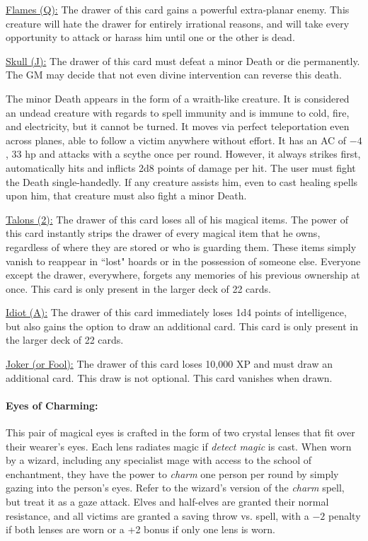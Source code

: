\begin{multicols}{2}
\underline{Flames (Q):} The drawer of this card gains a powerful extra-planar enemy.  This creature will hate the drawer for entirely irrational reasons, and will take every opportunity to attack or harass him until one or the other is dead. 

\underline{Skull (J):} The drawer of this card must defeat a minor Death or die permanently.  The GM may decide that not even divine intervention can reverse this death.  

The minor Death appears in the form of a wraith-like creature.  It is considered an undead creature with regards to spell immunity and is immune to cold, fire, and electricity, but it cannot be turned.  It moves via perfect teleportation even across planes, able to follow a victim anywhere without effort.  It has an AC of $-4$, 33 hp and attacks with a scythe once per round.  However, it always strikes first, automatically hits and inflicts 2d8 points of damage per hit.  The user must fight the Death single-handedly.  If any creature assists him, even to cast healing spells upon him, that creature must also fight a minor Death.  

\underline{Talons (2):} The drawer of this card loses all of his magical items.  The power of this card instantly strips the drawer of every magical item that he owns, regardless of where they are stored or who is guarding them.  These items simply vanish to reappear in ``lost" hoards or in the possession of someone else.  Everyone except the drawer, everywhere, forgets any memories of his previous ownership at once.  This card is only present in the larger deck of 22 cards.

\underline{Idiot (A):} The drawer of this card immediately loses 1d4 points of intelligence, but also gains the option to draw an additional card.  This card is only present in the larger deck of 22 cards.

\underline{Joker (or Fool):} The drawer of this card loses 10,000 XP and must draw an additional card.  This draw is not optional.  This card vanishes when drawn.

\paragraph{Eyes of Charming:} This pair of magical eyes is crafted in the form of two crystal lenses that fit over their wearer's eyes.  Each lens radiates magic if \textit{detect magic} is cast.  When worn by a wizard, including any specialist mage with access to the school of enchantment, they have the power to \textit{charm} one person per round by simply gazing into the person's eyes.  Refer to the wizard's version of the \textit{charm} spell, but treat it as a gaze attack.  Elves and half-elves are granted their normal resistance, and all victims are granted a saving throw vs. spell, with a $-2$ penalty if both lenses are worn or a +2 bonus if only one lens is worn.


\end{multicols}
